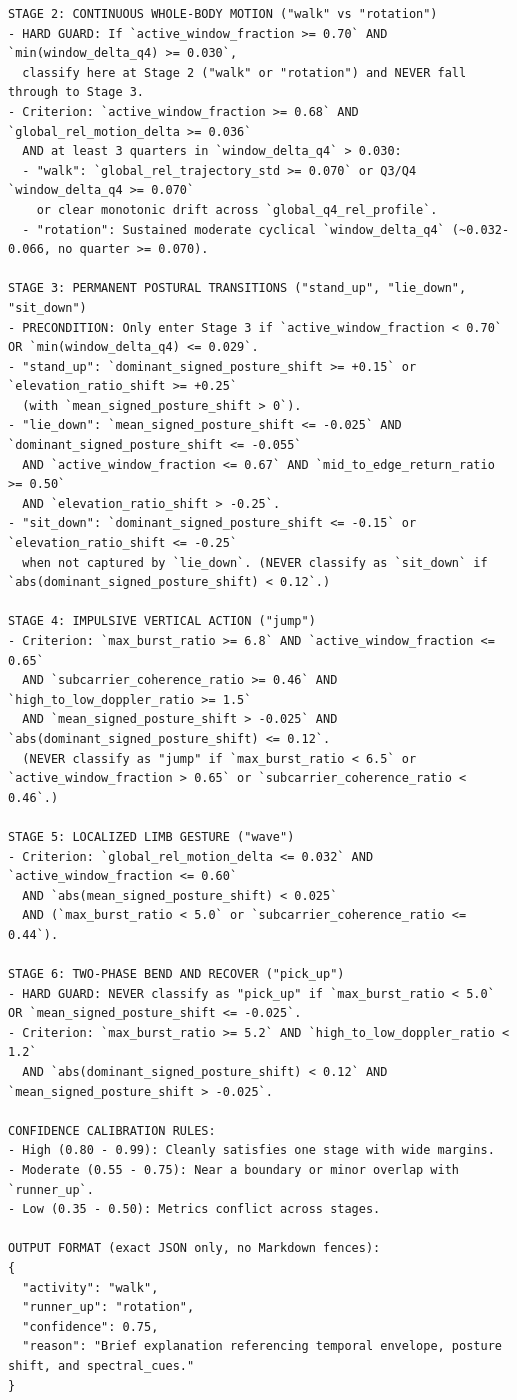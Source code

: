 \documentclass[11pt,a4paper]{article}
\begin{document}
\begin{lstlisting}[style=promptblock]
STAGE 2: CONTINUOUS WHOLE-BODY MOTION ("walk" vs "rotation")
- HARD GUARD: If `active_window_fraction >= 0.70` AND `min(window_delta_q4) >= 0.030`,
  classify here at Stage 2 ("walk" or "rotation") and NEVER fall through to Stage 3.
- Criterion: `active_window_fraction >= 0.68` AND `global_rel_motion_delta >= 0.036`
  AND at least 3 quarters in `window_delta_q4` > 0.030:
  - "walk": `global_rel_trajectory_std >= 0.070` or Q3/Q4 `window_delta_q4 >= 0.070`
    or clear monotonic drift across `global_q4_rel_profile`.
  - "rotation": Sustained moderate cyclical `window_delta_q4` (~0.032-0.066, no quarter >= 0.070).

STAGE 3: PERMANENT POSTURAL TRANSITIONS ("stand_up", "lie_down", "sit_down")
- PRECONDITION: Only enter Stage 3 if `active_window_fraction < 0.70` OR `min(window_delta_q4) <= 0.029`.
- "stand_up": `dominant_signed_posture_shift >= +0.15` or `elevation_ratio_shift >= +0.25`
  (with `mean_signed_posture_shift > 0`).
- "lie_down": `mean_signed_posture_shift <= -0.025` AND `dominant_signed_posture_shift <= -0.055`
  AND `active_window_fraction <= 0.67` AND `mid_to_edge_return_ratio >= 0.50`
  AND `elevation_ratio_shift > -0.25`.
- "sit_down": `dominant_signed_posture_shift <= -0.15` or `elevation_ratio_shift <= -0.25`
  when not captured by `lie_down`. (NEVER classify as `sit_down` if `abs(dominant_signed_posture_shift) < 0.12`.)

STAGE 4: IMPULSIVE VERTICAL ACTION ("jump")
- Criterion: `max_burst_ratio >= 6.8` AND `active_window_fraction <= 0.65`
  AND `subcarrier_coherence_ratio >= 0.46` AND `high_to_low_doppler_ratio >= 1.5`
  AND `mean_signed_posture_shift > -0.025` AND `abs(dominant_signed_posture_shift) <= 0.12`.
  (NEVER classify as "jump" if `max_burst_ratio < 6.5` or `active_window_fraction > 0.65` or `subcarrier_coherence_ratio < 0.46`.)

STAGE 5: LOCALIZED LIMB GESTURE ("wave")
- Criterion: `global_rel_motion_delta <= 0.032` AND `active_window_fraction <= 0.60`
  AND `abs(mean_signed_posture_shift) < 0.025`
  AND (`max_burst_ratio < 5.0` or `subcarrier_coherence_ratio <= 0.44`).

STAGE 6: TWO-PHASE BEND AND RECOVER ("pick_up")
- HARD GUARD: NEVER classify as "pick_up" if `max_burst_ratio < 5.0` OR `mean_signed_posture_shift <= -0.025`.
- Criterion: `max_burst_ratio >= 5.2` AND `high_to_low_doppler_ratio < 1.2`
  AND `abs(dominant_signed_posture_shift) < 0.12` AND `mean_signed_posture_shift > -0.025`.

CONFIDENCE CALIBRATION RULES:
- High (0.80 - 0.99): Cleanly satisfies one stage with wide margins.
- Moderate (0.55 - 0.75): Near a boundary or minor overlap with `runner_up`.
- Low (0.35 - 0.50): Metrics conflict across stages.

OUTPUT FORMAT (exact JSON only, no Markdown fences):
{
  "activity": "walk",
  "runner_up": "rotation",
  "confidence": 0.75,
  "reason": "Brief explanation referencing temporal envelope, posture shift, and spectral_cues."
}
\end{lstlisting}
\end{document}
